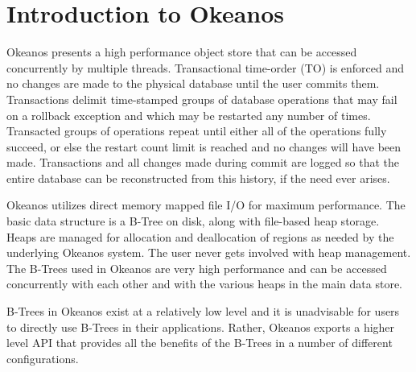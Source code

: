 \documentclass[article,oneside]{memoir}
\begin{document}

\chapter{Introduction to Okeanos}

Okeanos presents a high performance object store that can be accessed concurrently by multiple threads. Transactional time-order (TO) is enforced and no changes are made to the physical database until the user commits them. Transactions delimit time-stamped groups of database operations that may fail on a rollback exception and which may be restarted any number of times. Transacted groups of operations repeat until either all of the operations fully succeed, or else the restart count limit is reached and no changes will have been made. Transactions and all changes made during commit are logged so that the entire database can be reconstructed from this history, if the need ever arises.

Okeanos utilizes direct memory mapped file I/O for maximum performance. The basic data structure is a B-Tree on disk, along with file-based heap storage. Heaps are managed for allocation and deallocation of regions as needed by the underlying Okeanos system. The user never gets involved with heap management. The B-Trees used in Okeanos are very high performance and can be accessed concurrently with each other and with the various heaps in the main data store.

B-Trees in Okeanos exist at a relatively low level and it is unadvisable for users to directly use B-Trees in their applications. Rather, Okeanos exports a higher level API that provides all the benefits of the B-Trees in a number of different configurations. 
\end{document}
